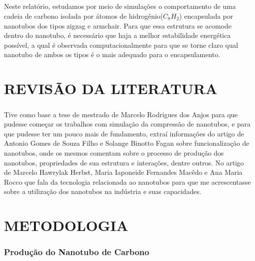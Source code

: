 \documentclass[12pt,a4paper]{report}
\begin{document}
\paragraph{} Neste relatório, estudamos por meio de simulações o comportamento de uma cadeia de carbono isolada por átomos de hidrogênio($C_{8}H_{2}$) encapsulada por nanotubos dos tipos zigzag e armchair. Para que essa estrutura se acomode dentro do nanotubo, é necessário que haja a melhor estabilidade energética possível, a qual é observada computacionalmente para que se torne claro qual nanotubo de ambos os tipos é o mais adequado para o encapsulamento.



\chapter*{REVISÃO DA LITERATURA}
\paragraph{}
Tive como base a tese de mestrado de Marcelo Rodrigues dos Anjos para que pudesse começar os trabalhos com simulação da compressão de nanotubos, e para que pudesse ter um pouco mais de fundamento, extraí informações do artigo de Antonio Gomes de Souza Filho e Solange Binotto Fagan sobre funcionalização de nanotubos, onde os mesmos comentam sobre o processo de produção dos nanotubos, propriedades de sua estrutura e interações, dentre outros. No artigo de Marcelo Hawrylak Herbst, Maria Iaponeide Fernandes Macêdo e Ana Maria Rocco que fala da tecnologia relacionada ao nanotubos para que me acrescentasse sobre a utilização dos nanotubos na indústria e suas capacidades.


\chapter*{METODOLOGIA}
\subsection*{Produção do Nanotubo de Carbono}
\end{document}
